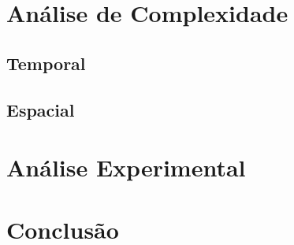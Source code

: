 \documentclass{article}
\begin{document}
\section{Análise de Complexidade}

\subsection{Temporal}

\subsection{Espacial}


\section{Análise Experimental}


\section{Conclusão}
\end{document}
